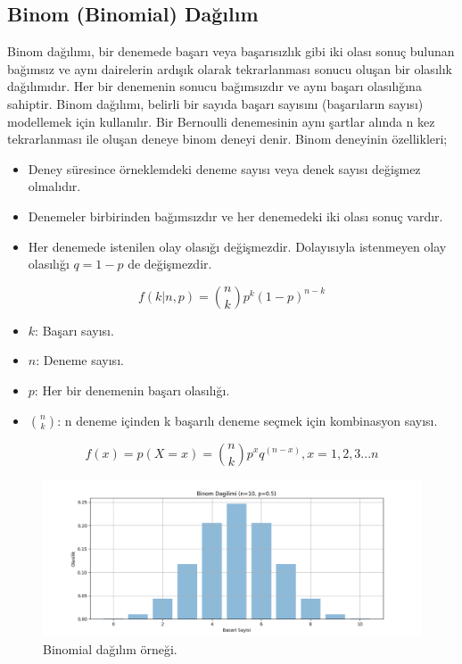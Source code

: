 \subsection{Binom (Binomial) Dağılım}
Binom dağılımı, bir denemede başarı veya başarısızlık gibi iki olası sonuç bulunan bağımsız ve aynı dairelerin ardışık olarak tekrarlanması sonucu oluşan bir olasılık dağılımıdır. Her bir denemenin sonucu bağımsızdır ve aynı başarı olasılığına sahiptir. Binom dağılımı, belirli bir sayıda başarı sayısını (başarıların sayısı) modellemek için kullanılır. Bir Bernoulli denemesinin aynı şartlar alında n kez tekrarlanması ile oluşan deneye binom deneyi denir. Binom deneyinin özellikleri;
\begin{itemize}
	\item Deney süresince örneklemdeki deneme sayısı veya denek sayısı değişmez olmalıdır.
	\item Denemeler birbirinden bağımsızdır ve her denemedeki iki olası sonuç vardır.
	\item Her denemede istenilen olay olasığı değişmezdir. Dolayısıyla istenmeyen olay olasılığı $q = 1 - p$ de değişmezdir.
\end{itemize}

\[f(k|n,p) = \binom{n}{k} p^k (1-p)^{n-k}\]
\begin{itemize}
	\item $k$: Başarı sayısı.
	\item $n$: Deneme sayısı.
	\item $p$: Her bir denemenin başarı olasılığı.
	\item $\binom{n}{k}$: n deneme içinden k başarılı deneme seçmek için kombinasyon sayısı.
\end{itemize}

\[
f(x) = p(X = x) = \binom{n}{k} p^x q^(n - x), x = 1,2,3...n
\]

\begin{figure}[h]
    \centering
    \includegraphics[width=1\textwidth]{images/binomial_distribution.png}
    \caption{Binomial dağılım örneği.}
    \label{fig:enter-label}
\end{figure}

